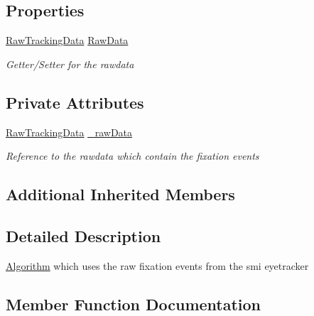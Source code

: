 \subsection*{Properties}
\begin{DoxyCompactItemize}
\item 
\hyperlink{class_web_analyzer_1_1_models_1_1_base_1_1_raw_tracking_data}{Raw\+Tracking\+Data} \hyperlink{class_web_analyzer_1_1_models_1_1_algorithm_model_1_1_i_view_events_algorithm_a1fbc48724f9cc7bea3d6ee03d9d533eb}{Raw\+Data}
\begin{DoxyCompactList}\small\item\em Getter/\+Setter for the rawdata \end{DoxyCompactList}\end{DoxyCompactItemize}
\subsection*{Private Attributes}
\begin{DoxyCompactItemize}
\item 
\hyperlink{class_web_analyzer_1_1_models_1_1_base_1_1_raw_tracking_data}{Raw\+Tracking\+Data} \hyperlink{class_web_analyzer_1_1_models_1_1_algorithm_model_1_1_i_view_events_algorithm_a61794c588714f70bca962727c730b52c}{\+\_\+raw\+Data}
\begin{DoxyCompactList}\small\item\em Reference to the rawdata which contain the fixation events \end{DoxyCompactList}\end{DoxyCompactItemize}
\subsection*{Additional Inherited Members}


\subsection{Detailed Description}
\hyperlink{class_web_analyzer_1_1_models_1_1_algorithm_model_1_1_algorithm}{Algorithm} which uses the raw fixation events from the smi eyetracker 



\subsection{Member Function Documentation}
\hypertarget{class_web_analyzer_1_1_models_1_1_algorithm_model_1_1_i_view_events_algorithm_aff1e838e0f623dbbeb6d856bffbf4b27}{}
